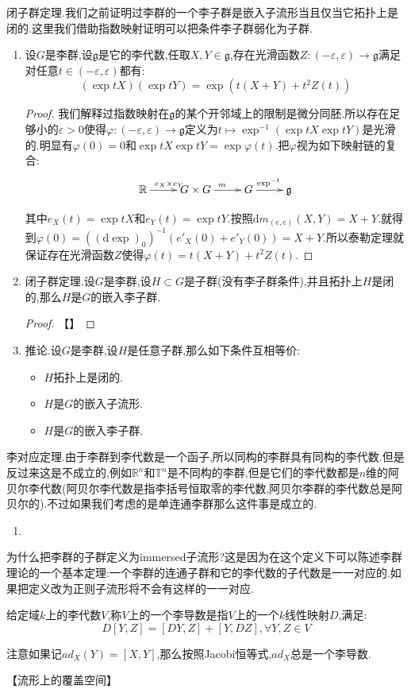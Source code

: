 闭子群定理.我们之前证明过李群的一个李子群是嵌入子流形当且仅当它拓扑上是闭的.这里我们借助指数映射证明可以把条件李子群弱化为子群.
\begin{enumerate}
	\item 设$G$是李群,设$\mathfrak{g}$是它的李代数,任取$X,Y\in\mathfrak{g}$,存在光滑函数$Z:(-\varepsilon,\varepsilon)\to\mathfrak{g}$满足对任意$t\in(-\varepsilon,\varepsilon)$都有:
	$$(\exp tX)(\exp tY)=\exp(t(X+Y)+t^2Z(t))$$
	\begin{proof}
		
		我们解释过指数映射在$\mathfrak{g}$的某个开邻域上的限制是微分同胚.所以存在足够小的$\varepsilon>0$使得$\varphi:(-\varepsilon,\varepsilon)\to\mathfrak{g}$定义为$t\mapsto\exp^{-1}(\exp tX\exp tY)$是光滑的.明显有$\varphi(0)=0$和$\exp tX\exp tY=\exp\varphi(t)$.把$\varphi$视为如下映射链的复合:
		$$\xymatrix{\mathbb{R}\ar[r]^{e_X\times e_Y}&G\times G\ar[r]^m&G\ar[r]^{\exp^{-1}}&\mathfrak{g}}$$
		
		其中$e_X(t)=\exp tX$和$e_Y(t)=\exp tY$.按照$\mathrm{d}m_{(e,e)}(X,Y)=X+Y$.就得到$\varphi(0)=((\mathrm{d}\exp)_0)^{-1}(e'_X(0)+e'_Y(0))=X+Y$.所以泰勒定理就保证存在光滑函数$Z$使得$\varphi(t)=t(X+Y)+t^2Z(t)$.
	\end{proof}
    \item 闭子群定理.设$G$是李群,设$H\subset G$是子群(没有李子群条件),并且拓扑上$H$是闭的,那么$H$是$G$的嵌入李子群.
    \begin{proof}
    	
    	【】
    \end{proof}
    \item 推论.设$G$是李群,设$H$是任意子群,那么如下条件互相等价:
    \begin{itemize}
    	\item $H$拓扑上是闭的.
    	\item $H$是$G$的嵌入子流形.
    	\item $H$是$G$的嵌入李子群.
    \end{itemize}
\end{enumerate}

李对应定理.由于李群到李代数是一个函子,所以同构的李群具有同构的李代数.但是反过来这是不成立的,例如$\mathbb{R}^n$和$\mathbb{T}^n$是不同构的李群,但是它们的李代数都是$n$维的阿贝尔李代数(阿贝尔李代数是指李括号恒取零的李代数,阿贝尔李群的李代数总是阿贝尔的).不过如果我们考虑的是单连通李群那么这件事是成立的.
\begin{enumerate}
	\item 
	
	
	
\end{enumerate}





为什么把李群的子群定义为immersed子流形?这是因为在这个定义下可以陈述李群理论的一个基本定理:一个李群的连通子群和它的李代数的子代数是一一对应的.如果把定义改为正则子流形将不会有这样的一一对应.

给定域$k$上的李代数$V$,称$V$上的一个李导数是指$V$上的一个$k$线性映射$D$,满足:
$$D[Y,Z]=[DY,Z]+[Y,DZ],\forall Y,Z\in V$$

注意如果记$ad_X(Y)=[X,Y]$,那么按照Jacobi恒等式,$ad_X$总是一个李导数.





【流形上的覆盖空间】
